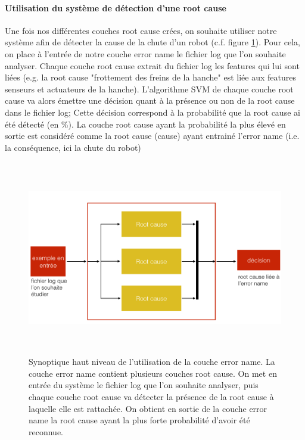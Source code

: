 \paragraph{Utilisation du système de détection d'une root cause}
Une fois nos différentes couches root cause crées, on souhaite utiliser notre système afin de détecter la cause de la chute d'un robot (c.f. figure \ref{fig:utilisation de la couche error name}). Pour cela, on place à l'entrée de notre couche error name le fichier log que l'on souhaite analyser. Chaque couche root cause extrait du fichier log les features qui lui sont liées (e.g. la root cause "frottement des freins de la hanche" est liée aux features senseurs et actuateurs de la hanche). L'algorithme SVM de chaque couche root cause va alors émettre une décision quant à la présence ou non de la root cause dans le fichier log; Cette décision correspond à la probabilité que la root cause ai été détecté (en \%). La couche root cause ayant la probabilité la plus élevé en sortie est considéré comme la root cause (cause) ayant entrainé l'error name (i.e. la conséquence, ici la chute du robot) 

\begin{figure}[h]
	\centering\includegraphics[height=8.5cm]{images/synoptique_error.png}
	\caption[Utilisation de la couche error name]{Synoptique haut niveau de l'utilisation de la couche error name. La couche error name contient plusieurs couches root cause. On met en entrée du système le fichier log que l'on souhaite analyser, puis chaque couche root cause va détecter la présence de la root cause à laquelle elle est rattachée. On obtient en sortie de la couche error name la root cause  ayant la plus forte probabilité d'avoir été reconnue.}
	\label{fig:utilisation de la couche error name}
\end{figure}

